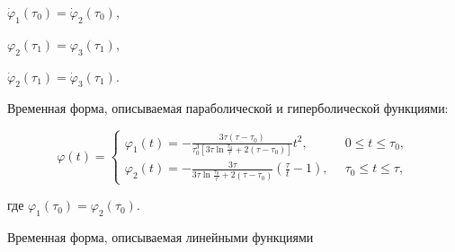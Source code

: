 $\dot {\varphi }_1 (\tau _0 ) = \dot {\varphi }_2 (\tau _0 )$,

$\varphi _2 (\tau _1 ) = \varphi _3 (\tau _1 )$, 

$\dot {\varphi }_2 (\tau _1 ) = \dot {\varphi }_3 (\tau _1 )$.



Временная форма, описываемая параболической и гиперболической функциями:

\begin{equation}

\label{gurevs:eq5}

\varphi (t) = \left\{ {\begin{array}{ll}

 \varphi _1 (t) = - \frac{3\tau \left( {\tau - \tau _0 } \right)}{\tau _0 

^3\left[ {3\tau \ln \frac{\tau _0 }{\tau } + 2\left( {\tau - \tau _0 } 

\right)} \right]}t^2,\;\;\;\;

& 0 \leqslant t \leqslant \tau _0, \\ 

 \varphi _2 (t) = - \frac{3\tau }{3\tau \ln \frac{\tau _0 }{\tau } + 2\left( 

{\tau - \tau _0 } \right)}\left( {\frac{\tau }{t} - 1} \right),\,\,\,

& \tau _0 

\leqslant t \leqslant \tau,

 \end{array}} \right.

\end{equation}

где $\varphi _1 (\tau _0 ) = \varphi _2 (\tau _0 )$.



Временная форма, описываемая линейными функциями

